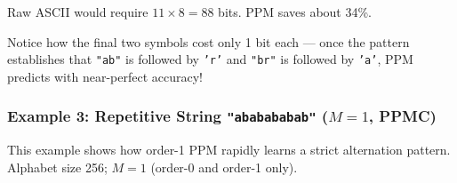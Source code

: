 \begin{examplebox}
Raw ASCII would require $11 \times 8 = 88$ bits. PPM saves about 34\%.

Notice how the final two symbols cost only 1 bit each — once the pattern
establishes that \texttt{"ab"} is followed by \texttt{'r'} and \texttt{"br"} is
followed by \texttt{'a'}, PPM predicts with near-perfect accuracy!
\end{examplebox}

\subsubsection{Example 3: Repetitive String \texttt{"ababababab"} ($M=1$, PPMC)}

This example shows how order-1 PPM rapidly learns a strict alternation pattern.
Alphabet size 256; $M=1$ (order-0 and order-1 only).

